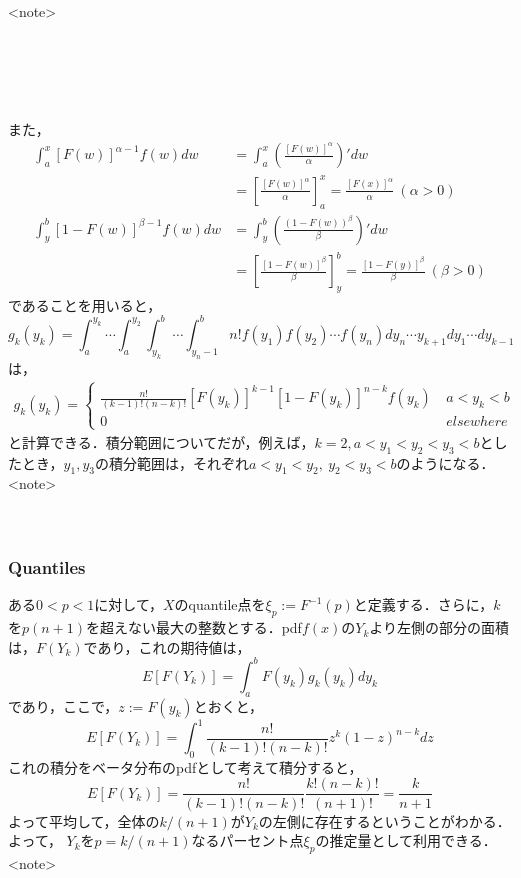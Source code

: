 \documentclass[11pt, a4paper]{jsarticle}
\begin{document}
<note>\\
\\
\\
\\
\\
\\
また，
\begin{align*}
\int_a^x \left[F(w)\right]^{\alpha-1}f(w)dw &= \int_a^x \left(\frac{\left[F(w)\right]^{\alpha}}{\alpha}\right)'dw\\
&= \left[\frac{\left[F(w)\right]^\alpha}{\alpha}\right]_a^x=\frac{\left[F(x)\right]^\alpha}{\alpha}\ (\alpha > 0)\\
\int_y^b[1 - F(w)]^{\beta - 1}f(w)dw &= \int_y^b \left(\frac{(1-F(w))^\beta}{\beta}\right)'dw\\
&= \left[\frac{\left[1-F(w)\right]^\beta}{\beta}\right]_y^b=\frac{\left[1-F(y)\right]^\beta}{\beta}\ (\beta > 0)
\end{align*}
であることを用いると，
$$g_k(y_k) = \int_a^{y_k}\cdots\int_a^{y_2}\int_{y_k}^b\cdots\int_{y_n-1}^bn!f(y_1)f(y_2)\cdots f(y_n)dy_n\cdots y_{k+1}dy_1\cdots dy_{k-1}$$
は，
\begin{align*}
g_k(y_k) = \left\{\begin{array}{ll}
\frac{n!}{(k-1)!(n-k)!}\left[F(y_k)\right]^{k-1}[1-F(y_k)]^{n-k}f(y_k)\ & a < y_k < b\\
0 & elsewhere
\end{array}\right.
\end{align*}
と計算できる．積分範囲についてだが，例えば，$k=2, a < y_1 < y_2 < y_3 < b$としたとき，$y_1, y_3$の積分範囲は，それぞれ$a < y_1 < y_2,\ y_2 < y_3 < b$のようになる．\\
<note>\\
\\
\\


\subsubsection{Quantiles}
ある$0<p<1$に対して，$X$のquantile点を$\xi_p := F^{-1}(p)$と定義する．さらに，$k$を$p(n+1)$を超えない最大の整数とする．pdf$f(x)$の$Y_k$より左側の部分の面積は，$F(Y_k)$であり，これの期待値は，
$$E[F(Y_k)] = \int_a^b F(y_k)g_k(y_k)dy_k$$
であり，ここで，$z := F(y_k)$とおくと，
$$E[F(Y_k)] = \int_0^1\frac{n!}{(k-1)!(n-k)!}z^k(1-z)^{n-k}dz$$
これの積分をベータ分布のpdfとして考えて積分すると，
$$E[F(Y_k)] = \frac{n!}{(k-1)!(n-k)!}\frac{k!(n-k)!}{(n+1)!} = \frac{k}{n+1}$$
よって平均して，全体の$k/(n+1)$が$Y_k$の左側に存在するということがわかる．よって， $Y_k$を$p = k/(n+1)$なるパーセント点$\xi_p$の推定量として利用できる．\\
<note>\\
\\
\\
\\
\end{document}
